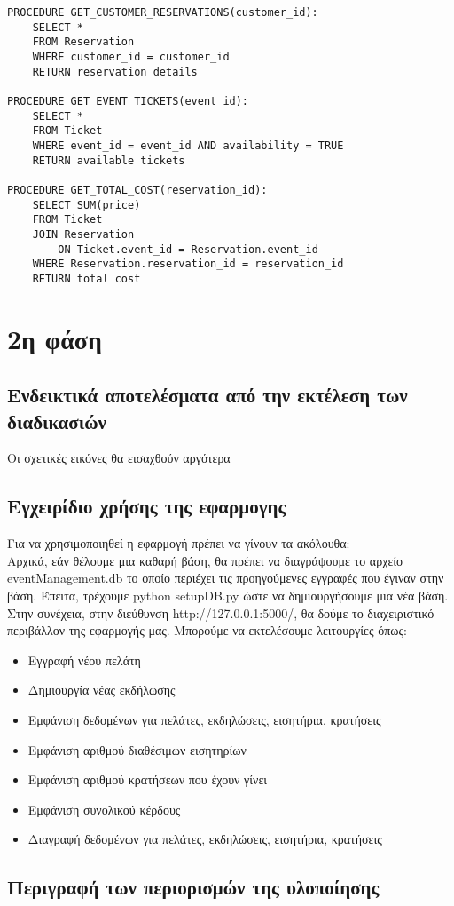 \documentclass{article}
\begin{document}
\begin{lstlisting}
PROCEDURE GET_CUSTOMER_RESERVATIONS(customer_id):
    SELECT * 
    FROM Reservation 
    WHERE customer_id = customer_id
    RETURN reservation details

PROCEDURE GET_EVENT_TICKETS(event_id):
    SELECT * 
    FROM Ticket 
    WHERE event_id = event_id AND availability = TRUE
    RETURN available tickets

PROCEDURE GET_TOTAL_COST(reservation_id):
    SELECT SUM(price) 
    FROM Ticket 
    JOIN Reservation 
        ON Ticket.event_id = Reservation.event_id
    WHERE Reservation.reservation_id = reservation_id
    RETURN total cost

\end{lstlisting}
\section*{2η φάση}
\subsection*{Ενδεικτικά αποτελέσματα από την εκτέλεση των διαδικασιών}
Οι σχετικές εικόνες θα εισαχθούν αργότερα
\subsection*{Εγχειρίδιο χρήσης της εφαρμογης}
Για να χρησιμοποιηθεί η εφαρμογή πρέπει να γίνουν τα ακόλουθα:\\
Αρχικά, εάν θέλουμε μια καθαρή βάση, θα πρέπει να διαγράψουμε το αρχείο eventManagement.db το οποίο περιέχει τις προηγούμενες εγγραφές που έγιναν στην βάση. Έπειτα, τρέχουμε python setupDB.py ώστε να δημιουργήσουμε μια νέα βάση. Στην συνέχεια, στην διεύθυνση http://127.0.0.1:5000/, θα δούμε το διαχειριστικό περιβάλλον της εφαρμογής μας. Μπορούμε να εκτελέσουμε λειτουργίες όπως:\\
\begin{itemize}
	\item{Εγγραφή νέου πελάτη}
	\item{Δημιουργία νέας εκδήλωσης}
	\item{Εμφάνιση δεδομένων για πελάτες, εκδηλώσεις, εισητήρια, κρατήσεις}
	\item{Εμφάνιση αριθμού διαθέσιμων εισητηρίων}
	\item{Εμφάνιση αριθμού κρατήσεων που έχουν γίνει}
	\item{Εμφάνιση συνολικού κέρδους}
	\item{Διαγραφή δεδομένων για πελάτες, εκδηλώσεις, εισητήρια, κρατήσεις}
\end{itemize}
\subsection*{Περιγραφή των περιορισμών της υλοποίησης}
\end{document}
